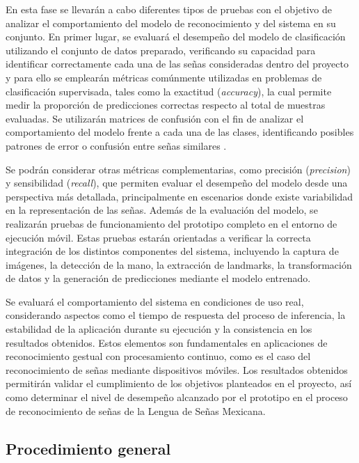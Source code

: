 	En esta fase se llevarán a cabo diferentes tipos de pruebas con el objetivo de
	analizar el comportamiento del modelo de reconocimiento y del sistema en su
	conjunto. En primer lugar, se evaluará el desempeño del modelo de clasificación
	utilizando el conjunto de datos preparado, verificando su capacidad para
	identificar correctamente cada una de las señas consideradas dentro del
	proyecto y para ello se emplearán métricas comúnmente utilizadas en problemas de
	clasificación supervisada, tales como la exactitud (\textit{accuracy}), la cual
	permite medir la proporción de predicciones correctas respecto al total de
	muestras evaluadas. Se utilizarán matrices de confusión con el
	fin de analizar el comportamiento del modelo frente a cada una de las clases,
	identificando posibles patrones de error o confusión entre señas similares
	\cite{geron2019,goodfellow2016}.
	
	Se podrán considerar otras métricas complementarias, como precisión
	(\textit{precision}) y sensibilidad (\textit{recall}), que permiten evaluar el
	desempeño del modelo desde una perspectiva más detallada, principalmente en
	escenarios donde existe variabilidad en la representación de las señas. Además de la evaluación del modelo, se realizarán pruebas de funcionamiento del
	prototipo completo en el entorno de ejecución móvil. Estas pruebas estarán
	orientadas a verificar la correcta integración de los distintos componentes del
	sistema, incluyendo la captura de imágenes, la detección de la mano, la
	extracción de landmarks, la transformación de datos y la generación de
	predicciones mediante el modelo entrenado.
	
	Se evaluará el comportamiento del sistema en condiciones de
	uso real, considerando aspectos como el tiempo de respuesta del proceso de
	inferencia, la estabilidad de la aplicación durante su ejecución y la
	consistencia en los resultados obtenidos. Estos elementos son fundamentales en
	aplicaciones de reconocimiento gestual con procesamiento continuo, como es el caso del
	reconocimiento de señas mediante dispositivos móviles. Los resultados obtenidos permitirán validar el cumplimiento de los
	objetivos planteados en el proyecto, así como determinar el nivel de desempeño
	alcanzado por el prototipo en el proceso de reconocimiento de señas de la Lengua
	de Señas Mexicana.
	
	\subsection{Procedimiento general}
	
